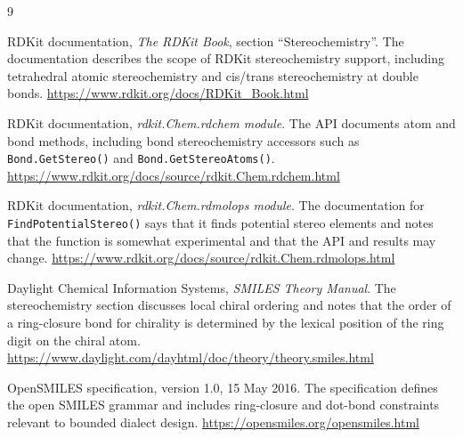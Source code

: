 \documentclass[10pt,a4paper]{article}
\theoremstyle{definition}
\theoremstyle{remark}
\begin{document}
\begin{thebibliography}{9}

RDKit documentation, \emph{The RDKit Book}, section ``Stereochemistry''.
The documentation describes the scope of RDKit stereochemistry support, including
tetrahedral atomic stereochemistry and cis/trans stereochemistry at double
bonds.
\url{https://www.rdkit.org/docs/RDKit_Book.html}

RDKit documentation, \emph{rdkit.Chem.rdchem module}.
The API documents atom and bond methods, including bond stereochemistry accessors
such as \texttt{Bond.GetStereo()} and \texttt{Bond.GetStereoAtoms()}.
\url{https://www.rdkit.org/docs/source/rdkit.Chem.rdchem.html}

RDKit documentation, \emph{rdkit.Chem.rdmolops module}.
The documentation for \texttt{FindPotentialStereo()} says that it finds
potential stereo elements and notes that the function is somewhat experimental
and that the API and results may change.
\url{https://www.rdkit.org/docs/source/rdkit.Chem.rdmolops.html}

Daylight Chemical Information Systems, \emph{SMILES Theory Manual}.
The stereochemistry section discusses local chiral ordering and notes that the
order of a ring-closure bond for chirality is determined by the lexical position
of the ring digit on the chiral atom.
\url{https://www.daylight.com/dayhtml/doc/theory/theory.smiles.html}

OpenSMILES specification, version 1.0, 15 May 2016.
The specification defines the open SMILES grammar and includes ring-closure and
dot-bond constraints relevant to bounded dialect design.
\url{https://opensmiles.org/opensmiles.html}

\end{thebibliography}
\end{document}
